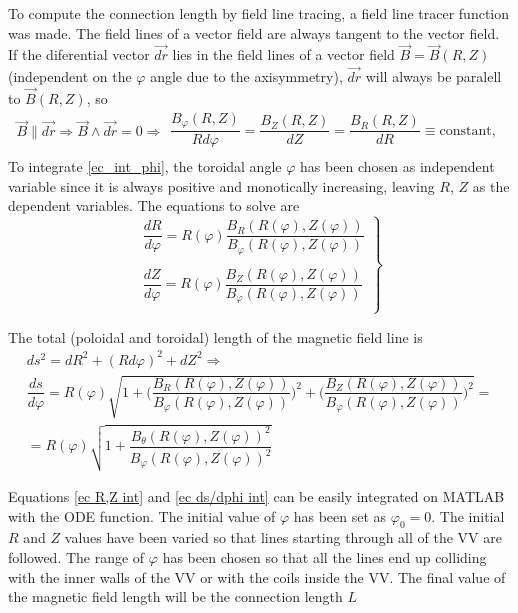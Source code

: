 \documentclass[a4paper,12pt,oneside]{book}
\begin{document}
To compute the connection length by field line tracing, a field line tracer function was made. The field lines of a vector field are always tangent to the vector field. If the diferential vector $\vec{dr}$ lies in the  field lines of a vector field $\vec{B}=\vec{B}(R,Z)$ (independent on the $\varphi$ angle due to the axisymmetry), $\vec{dr}$ will always be paralell to $\vec{B}(R,Z)$, so
%
\begin{equation}\label{ec_int_phi}
\vec{B} \parallel \vec{dr} \Rightarrow\vec{B} \wedge \vec{dr}=0 \Rightarrow 
\left.
\begin{array}{c}
\dfrac{B_{\varphi}(R,Z)}{R d\varphi}= \dfrac{B_Z(R,Z)}{dZ}=\dfrac{B_R(R,Z)}{dR} \equiv \text{constant}, \\
\end{array} 
\right.
\end{equation}
To integrate \eqref{ec_int_phi}, the toroidal angle $\varphi$ has been chosen as independent variable since it is always positive and monotically increasing, leaving $R$, $Z$ as the dependent variables. The equations to solve are
%
\begin{equation}\label{ec R,Z int}
\left. \begin{array}{c} 
\dfrac{dR}{d\varphi}=R(\varphi) \dfrac{B_R(R(\varphi),Z(\varphi))}{B_\varphi(R(\varphi),Z(\varphi))} \\ 
\\
\dfrac{dZ}{d\varphi}=R(\varphi) \dfrac{B_Z(R(\varphi),Z(\varphi))}{B_\varphi(R(\varphi),Z(\varphi))}  \\
\end{array} \right\}
\end{equation}

The total (poloidal and toroidal) length of the magnetic field line is 
%
\begin{equation}\label{ec ds/dphi int}
\left.
\begin{array}{c}
ds^2=dR^2+(Rd\varphi)^2+dZ^2 \Rightarrow \\ \dfrac{ds}{d \varphi}=R(\varphi) \sqrt{1+ \Big( \dfrac{B_R(R(\varphi),Z(\varphi))}{B_\varphi(R(\varphi),Z(\varphi))} \Big)^2+ \Big( \dfrac{B_Z(R(\varphi),Z(\varphi))}{B_\varphi(R(\varphi),Z(\varphi))} \Big)^2}= \\ =R(\varphi) \sqrt{1+\dfrac{B_\theta(R(\varphi),Z(\varphi))^2}{B_\varphi(R(\varphi),Z(\varphi))^2}}
\end{array}
\right.
\end{equation}

Equations \eqref{ec R,Z int} and \eqref{ec ds/dphi int} can be easily integrated on MATLAB with the ODE function. The initial value of $\varphi$ has been set as $\varphi_0=0$. The initial $R$ and $Z$ values have been varied so that lines starting through all of the VV are followed. The range of $\varphi$ has been chosen so that all the lines end up colliding with the inner walls of the VV or with the coils inside the VV. The final value of the magnetic field length will be the connection length $L$
\end{document}
